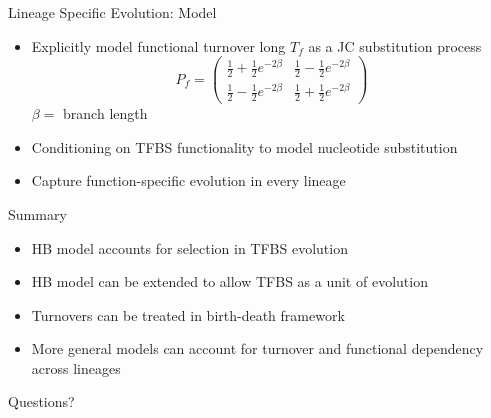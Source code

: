 \documentclass[10pt]{beamer}
\begin{document}
\begin{frame}[fragile]{Lineage Specific Evolution: Model}
\begin{itemize}
\item Explicitly model functional turnover long $T_f$ as a JC substitution process 
$$ P_f = \begin{pmatrix}
\frac{1}{2} + \frac{1}{2} e^{-2\beta} & \frac{1}{2} - \frac{1}{2} e^{-2\beta}\\
\frac{1}{2} - \frac{1}{2} e^{-2\beta} & \frac{1}{2} + \frac{1}{2} e^{-2\beta}
\end{pmatrix}$$ 
$ \beta = $ branch length
\item Conditioning on TFBS functionality to model nucleotide substitution
\item Capture function-specific evolution in every lineage
\end{itemize}
\end{frame}


\begin{frame}{Summary}
\begin{itemize}
\item HB model accounts for selection in TFBS evolution 
\item HB model can be extended to allow TFBS as a unit of evolution
\item Turnovers can be treated in birth-death framework
\item More general models can account for turnover and functional dependency across lineages
\end{itemize}
\end{frame}

\begin{frame}[standout]
  Questions?
\end{frame}

\appendix
\end{document}
